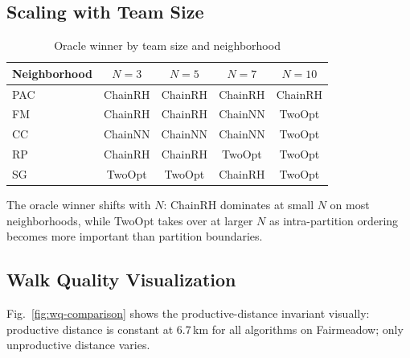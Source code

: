 \documentclass[conference]{IEEEtran}
\begin{document}
\subsection{Scaling with Team Size}

\begin{table}[htbp]
\caption{Oracle winner by team size and neighborhood}
\label{tab:scaling}
\begin{center}
\begin{tabular}{l cccc}
\toprule
\textbf{Neighborhood} & $N{=}3$ & $N{=}5$ & $N{=}7$ & $N{=}10$ \\
\midrule
PAC & ChainRH & ChainRH & ChainRH & ChainRH \\
FM  & ChainRH & ChainRH & ChainNN & TwoOpt \\
CC  & ChainNN & ChainNN & ChainNN & TwoOpt \\
RP  & ChainRH & ChainRH & TwoOpt  & TwoOpt \\
SG  & TwoOpt  & TwoOpt  & ChainRH & TwoOpt \\
\bottomrule
\end{tabular}
\end{center}
\end{table}

The oracle winner shifts with $N$: ChainRH dominates at small $N$ on most neighborhoods, while TwoOpt takes over at larger $N$ as intra-partition ordering becomes more important than partition boundaries.

\subsection{Walk Quality Visualization}

Fig.~\ref{fig:wq-comparison} shows the productive-distance invariant visually: productive distance is constant at 6.7\,km for all algorithms on Fairmeadow; only unproductive distance varies.
\end{document}
